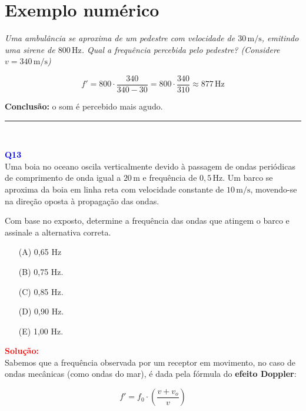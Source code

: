 \documentclass[a4paper,12pt]{article}
\begin{document}
\section{Exemplo numérico}

\textit{Uma ambulância se aproxima de um pedestre com velocidade de \(30 \, \text{m/s}\), emitindo uma sirene de \(800\,\text{Hz}\). Qual a frequência percebida pelo pedestre? (Considere \(v = 340\,\text{m/s}\))}

\[
f' = 800 \cdot \frac{340}{340 - 30} = 800 \cdot \frac{340}{310} \approx 877\,\text{Hz}
\]

\textbf{Conclusão:} o som é percebido mais agudo.

\noindent\rule{\linewidth}{0.6pt}\\

\begin{flushleft}
\textbf{\textcolor{blue}{\Large Q13}}\\
Uma boia no oceano oscila verticalmente devido à passagem de ondas periódicas de comprimento de onda 
igual a \(20\,\text{m}\) e frequência de \(0{,}5\,\text{Hz}\). Um barco se aproxima da boia em linha 
reta com velocidade constante de \(10\,\text{m/s}\), movendo-se na direção oposta à propagação das ondas.

Com base no exposto, determine a frequência das ondas que atingem o barco e assinale a alternativa correta.

\begin{itemize}
\item[(A)] 0{,}65 Hz 
\item[(B)] 0{,}75 Hz.
\item[(C)] 0{,}85 Hz.
\item[(D)] 0{,}90 Hz.
\item[(E)] 1,00 Hz.
\end{itemize}

\vspace{0.5cm}

\textcolor{red}{\textbf{Solução:}}\\

\noindent
Sabemos que a frequência observada por um receptor em movimento, no caso de \colorbox{yellow!20}{ondas} \colorbox{yellow!20}{mecânicas (como ondas do mar), 
é dada pela fórmula do \textbf{efeito Doppler}:}

\begin{equation}
\boxed{
f' = f_0 \cdot \left( \frac{v + v_o}{v} \right)
}
\end{equation}


\end{flushleft}
\end{document}
